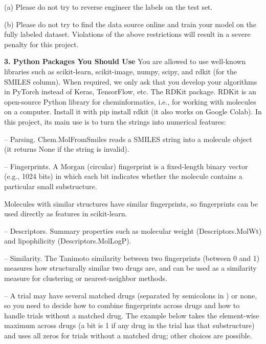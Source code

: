 \documentclass[11pt,letterpaper]{article}
\begin{document}
(a) Please do not try to reverse engineer the labels on the test set.

(b) Please do not try to find the data source online and train your model on the fully labeled
dataset. Violations of the above restrictions will result in a severe penalty for this project.

\textbf{3. Python Packages You Should Use} You are allowed to use well-known libraries such as scikit-learn, scikit-image, numpy, scipy, and rdkit (for the SMILES column). When required, we only ask that you develop your algorithms in PyTorch instead of Keras, TensorFlow, etc. The RDKit package. RDKit is an open-source Python library for cheminformatics, i.e., for working with molecules on a computer. Install it with pip install rdkit (it also works on Google Colab). In this project, its main use is to turn the  strings into numerical features:

-- Parsing. Chem.MolFromSmiles reads a SMILES string into a molecule object (it returns None if the
string is invalid).

-- Fingerprints. A Morgan (circular) fingerprint is a fixed-length binary vector (e.g., 1024 bits)
in which each bit indicates whether the molecule contains a particular small substructure.

Molecules with similar structures have similar fingerprints, so fingerprints can be used directly as
features in scikit-learn.

-- Descriptors. Summary properties such as molecular weight (Descriptors.MolWt) and lipophilicity
(Descriptors.MolLogP).

-- Similarity. The Tanimoto similarity between two fingerprints (between 0 and 1) measures how
structurally similar two drugs are, and can be used as a similarity measure for clustering or
nearest-neighbor methods.

-- A trial may have several matched drugs (separated by semicolons in ) or none,
so you need to decide how to combine fingerprints across drugs and how to handle trials without a
matched drug. The example below takes the element-wise maximum across drugs (a bit is 1 if any drug
in the trial has that substructure) and uses all zeros for trials without a matched drug; other
choices are possible.
\end{document}
